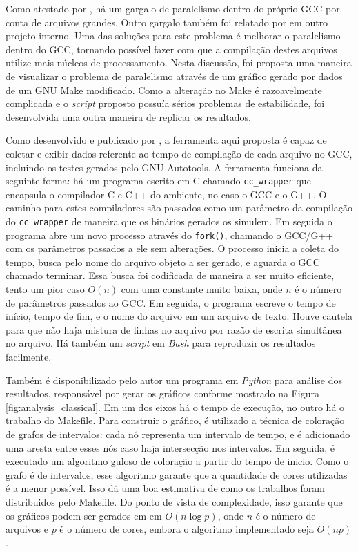 Como atestado por \cite{PR84402}, há um gargalo de paralelismo dentro do
próprio GCC por conta de arquivos grandes. Outro gargalo também foi relatado
por \cite{mailgcc} em outro projeto interno. Uma das soluções para este
problema é melhorar o paralelismo dentro do GCC, tornando possível fazer
com que a compilação destes arquivos utilize mais núcleos de processamento.
Nesta discussão, foi proposta uma maneira de visualizar o problema de
paralelismo através de um gráfico gerado por dados de um GNU Make modificado.
Como a alteração no Make é razoavelmente complicada e o \textit{script} proposto
possuía sérios problemas de estabilidade, foi desenvolvida uma outra maneira
de replicar os resultados.

Como desenvolvido e publicado por \cite{gcctimer}, a ferramenta aqui proposta
é capaz de coletar e exibir dados referente ao tempo de compilação
de cada arquivo no GCC, incluindo os testes gerados pelo GNU Autotools.
A ferramenta funciona da seguinte forma: há um programa escrito em C chamado
\texttt{cc\_wrapper} que encapsula o compilador C e C++ do ambiente, no caso o 
GCC e o G++. O caminho para estes compiladores são passados como um parâmetro
da compilação do \texttt{cc\_wrapper} de maneira que os binários gerados os
simulem. Em seguida o programa abre um novo processo através do \texttt{fork()},
chamando o GCC/G++ com os parâmetros passados a ele sem alterações. O processo
inicia a coleta do tempo, busca pelo nome do arquivo objeto a ser gerado, e
aguarda o GCC chamado terminar. Essa busca foi codificada de maneira a ser
muito eficiente, tento um pior caso $O(n)$ com uma constante muito baixa,
onde $n$ é o número de parâmetros passados ao GCC. Em seguida, o programa
escreve o tempo de início, tempo de fim, e o nome do arquivo em um arquivo
de texto. Houve cautela para que não haja mistura de linhas
no arquivo por razão de escrita simultânea no arquivo. Há também um \textit{script}
em \textit{Bash} para reproduzir os resultados facilmente.

Também é disponibilizado pelo autor um programa em \textit{Python} para análise dos
resultados, responsável por gerar os gráficos conforme
mostrado na Figura \ref{fig:analysis_classical}. Em um dos eixos há o
tempo de execução, no outro há
o trabalho do Makefile. Para construir o gráfico, é utilizado a técnica
de coloração de grafos de intervalos: cada nó representa um intervalo de
tempo, e é adicionado uma aresta entre esses nós caso haja intersecção nos
intervalos. Em seguida, é executado um algoritmo guloso de coloração a
partir do tempo de inicio. Como o grafo é de intervalos, esse algoritmo
garante que a quantidade de cores utilizadas é a menor possível. Isso dá
uma boa estimativa de como os trabalhos foram distribuidos pelo Makefile.
Do ponto de vista de complexidade, isso garante que os gráficos podem ser
gerados em em $O(n \log p)$, onde $n$ é o número de arquivos e $p$ é o número de
cores, embora o algoritmo implementado seja $O(np)$.

